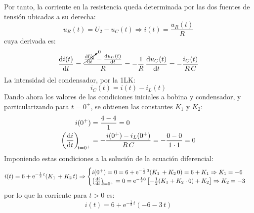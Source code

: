\begin{example}
	    Por tanto, la corriente en la resistencia queda determinada por las dos fuentes de tensión ubicadas a su derecha:
	    \begin{equation*}
	        u_R(t)=U_2-u_C(t)\Rightarrow i(t)=\dfrac{u_R(t)}{R}
	    \end{equation*}
	    cuya derivada es: 
	    \begin{equation*}
	        \diff{i(t)}{t}=\dfrac{\cancelto{0}{\diff{U_2}{t}}-\diff{u_C(t)}{t}}{R}=-\dfrac{1}{R}\,\diff{u_C(t)}{t}=-\dfrac{i_C(t)}{R\,C}
	    \end{equation*}
	    La intensidad del condensador, por la 1LK:
	    \begin{equation*}
	        i_C(t)=i(t)-i_L(t)
	    \end{equation*}
	    Dando ahora los valores de las condiciones iniciales a bobina y condensador, y particularizando para $t=0^+$, se obtienen las constantes $K_1$ y $K_2$:
	    \begin{align*}
	        i(0^+)&=\dfrac{4-4}{1}=0\\
	        \diff{i}{t}[t = 0^+]&=-\dfrac{i(0^+)-i_L(0^+)}{R\,C}=-\dfrac{0-0}{1\cdot 1}=0
	    \end{align*}
	    Imponiendo estas condiciones a la solución de la ecuación diferencial:
	    \begin{equation*}
	        i(t)=6+\mathrm{e}^{-\frac{1}{2}\,t}(K_1\,+K_2\,t)\Rightarrow
	        \begin{cases}
	            i(0^+)=0=6+\mathrm{e}^{-\frac{1}{2}\,0}(K_1\,+K_2\,0)=6+K_1\Rightarrow K_1=-6\\
	            \diff{i}{t}[t = 0^+]=0=\mathrm{e}^{-\frac{1}{2}0}\left[-\frac{1}{2}(K_1+K_2\cdot 0)+K_2 \right]\Rightarrow K_2=-3
	        \end{cases}
	    \end{equation*}
	    por lo que la corriente para $t>0$ es:
	    \begin{equation*}
	        i(t)=6+\mathrm{e}^{-\frac{1}{2}\,t}(-6-3\,t)
	    \end{equation*}
	    
	\end{example}
	
